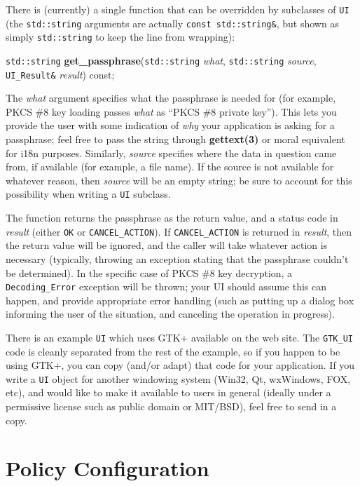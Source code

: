 \documentclass{article}
\newcommand{\function}[1]{\textbf{#1}}
\newcommand{\type}[1]{\texttt{#1}}
\renewcommand{\arg}[1]{\textsl{#1}}
\begin{document}
There is (currently) a single function that can be overridden by subclasses of
\type{UI} (the \type{std::string} arguments are actually \type{const
std::string\&}, but shown as simply \type{std::string} to keep the line from
wrapping):

\noindent
\type{std::string} \function{get\_passphrase}(\type{std::string} \arg{what},
                                              \type{std::string} \arg{source},
                                     \type{UI\_Result\&} \arg{result}) const;

The \arg{what} argument specifies what the passphrase is needed for (for
example, PKCS \#8 key loading passes \arg{what} as ``PKCS \#8 private
key''). This lets you provide the user with some indication of \emph{why} your
application is asking for a passphrase; feel free to pass the string through
\function{gettext(3)} or moral equivalent for i18n purposes. Similarly,
\arg{source} specifies where the data in question came from, if available (for
example, a file name). If the source is not available for whatever reason, then
\arg{source} will be an empty string; be sure to account for this possibility
when writing a \type{UI} subclass.

The function returns the passphrase as the return value, and a status code in
\arg{result} (either \type{OK} or \type{CANCEL\_ACTION}). If
\type{CANCEL\_ACTION} is returned in \arg{result}, then the return value will
be ignored, and the caller will take whatever action is necessary (typically,
throwing an exception stating that the passphrase couldn't be determined). In
the specific case of PKCS \#8 key decryption, a \type{Decoding\_Error}
exception will be thrown; your UI should assume this can happen, and provide
appropriate error handling (such as putting up a dialog box informing the user
of the situation, and canceling the operation in progress).

There is an example \type{UI} which uses GTK+ available on the web site. The
\type{GTK\_UI} code is cleanly separated from the rest of the example, so if
you happen to be using GTK+, you can copy (and/or adapt) that code for your
application. If you write a \type{UI} object for another windowing system
(Win32, Qt, wxWindows, FOX, etc), and would like to make it available to users
in general (ideally under a permissive license such as public domain or
MIT/BSD), feel free to send in a copy.

\pagebreak
\section{Policy Configuration}
\end{document}
